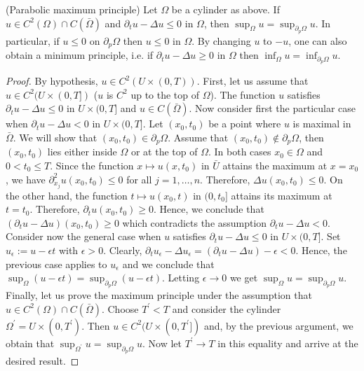 \documentclass[11pt]{article}
\begin{document}
			\begin{lemma}
				(Parabolic maximum principle) Let $\Omega$ be a cylinder as above. If $u\in C^2(\Omega)\cap C(\bar{\Omega})$ and $\partial_t u-\Delta u\le0$ in $\Omega$, then $\sup_\Omega u=\sup_{\partial_p\Omega}u$. In particular, if $u\le0$ on $\partial_p\Omega$ then $u\le0$ in $\Omega$. By changing $u$ to $-u$, one can also obtain a minimum principle, i.e. if $\partial_t u-\Delta u\ge0$ in $\Omega$ then $\inf_\Omega u=\inf_{\partial_p\Omega}u$.
			\end{lemma}
			\begin{proof}
				By hypothesis, $u\in C^2(U\times(0,T))$. First, let us assume that $u\in C^2(U\times(0,T])$ ($u$ is $C^2$ up to the top of $\Omega$). The function $u$ satisfies $\partial_tu-\Delta u\le0$ in $U\times (0,T]$ and $u\in C(\bar{\Omega})$. Now consider first the particular case when $\partial_tu-\Delta u<0$ in $U\times(0,T]$. Let $(x_0,t_0)$ be a point where $u$ is maximal in $\bar{\Omega}$. We will show that $(x_0,t_0)\in\partial_p\Omega$. Assume that $(x_0,t_0)\notin\partial_p\Omega$, then $(x_0,t_0)$ lies either inside $\Omega$ or at the top of $\Omega$. In both cases $x_0\in\Omega$ and $0<t_0\le T$. Since the function $x\mapsto u(x,t_0)$ in $\bar{U}$ attains the maximum at $x=x_0$, we have $\partial_{x_{j}}^2u(x_0,t_0)\le0$ for all $j=1,\dots,n$. Therefore, $\Delta u(x_0,t_0)\le0$. On the other hand, the function $t\mapsto u(x_0,t)$ in $(0,t_0]$ attains its maximum at $t=t_0$. Therefore, $\partial_t u(x_0,t_0)\ge0$.
				Hence, we conclude that $(\partial_t u-\Delta u)(x_0,t_0)\ge0$ which contradicts the assumption $\partial_tu-\Delta u<0$. Consider now the general case when $u$ satisfies $\partial_tu-\Delta u\le0$ in $U\times(0,T]$. Set $u_\epsilon:=u-\epsilon t$ with $\epsilon>0$. Clearly, $\partial_tu_\epsilon-\Delta u_\epsilon=(\partial_tu-\Delta u)-\epsilon<0$. Hence, the previous case applies to $u_\epsilon$ and we conclude that $\sup_\Omega(u-\epsilon t)=\sup_{\partial_p\Omega}(u-\epsilon t)$. Letting $\epsilon\to0$ we get $\sup_\Omega u=\sup_{\partial_p\Omega}u$. Finally, let us prove the maximum principle under the assumption that $u\in C^2(\Omega)\cap C(\bar{\Omega})$. Choose $T^\prime<T$ and consider the cylinder $\Omega^\prime=U\times(0,T^\prime)$. Then $u\in C^2(U\times(0,T^\prime])$ and, by the previous argument, we obtain that $\sup_{\Omega^\prime}u=\sup_{\partial_p\Omega}u$. Now let $T^\prime\to T$ in this equality and arrive at the desired result.
			\end{proof}
\end{document}
